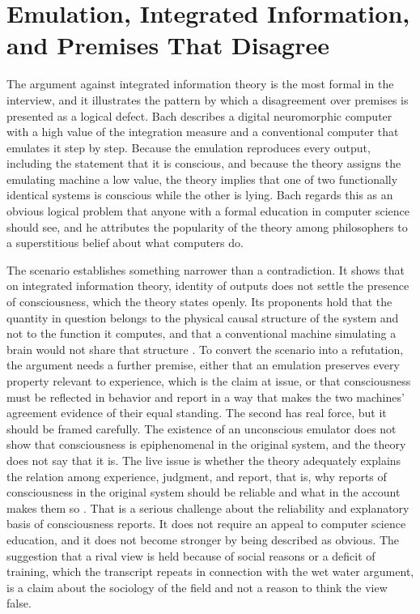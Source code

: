 \documentclass[11pt]{article}
\begin{document}
\section{Emulation, Integrated Information, and Premises That Disagree}

The argument against integrated information theory is the most formal in the interview, and it illustrates the pattern by which a disagreement over premises is presented as a logical defect. Bach describes a digital neuromorphic computer with a high value of the integration measure and a conventional computer that emulates it step by step. Because the emulation reproduces every output, including the statement that it is conscious, and because the theory assigns the emulating machine a low value, the theory implies that one of two functionally identical systems is conscious while the other is lying. Bach regards this as an obvious logical problem that anyone with a formal education in computer science should see, and he attributes the popularity of the theory among philosophers to a superstitious belief about what computers do.

The scenario establishes something narrower than a contradiction. It shows that on integrated information theory, identity of outputs does not settle the presence of consciousness, which the theory states openly. Its proponents hold that the quantity in question belongs to the physical causal structure of the system and not to the function it computes, and that a conventional machine simulating a brain would not share that structure \cite{tononi2015}. To convert the scenario into a refutation, the argument needs a further premise, either that an emulation preserves every property relevant to experience, which is the claim at issue, or that consciousness must be reflected in behavior and report in a way that makes the two machines' agreement evidence of their equal standing. The second has real force, but it should be framed carefully. The existence of an unconscious emulator does not show that consciousness is epiphenomenal in the original system, and the theory does not say that it is. The live issue is whether the theory adequately explains the relation among experience, judgment, and report, that is, why reports of consciousness in the original system should be reliable and what in the account makes them so \cite{chalmers1996}. That is a serious challenge about the reliability and explanatory basis of consciousness reports. It does not require an appeal to computer science education, and it does not become stronger by being described as obvious. The suggestion that a rival view is held because of social reasons or a deficit of training, which the transcript repeats in connection with the wet water argument, is a claim about the sociology of the field and not a reason to think the view false.
\end{document}
